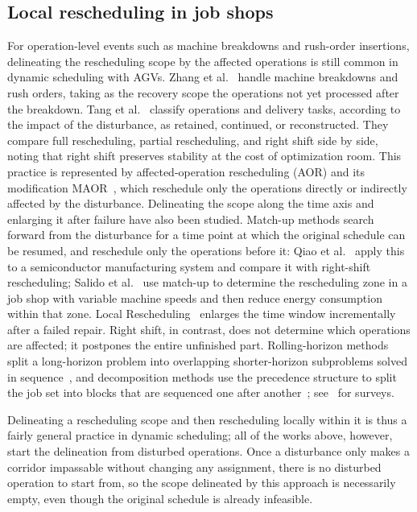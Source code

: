 \documentclass[manuscript,screen,review]{acmart}
\begin{document}
\subsection{Local rescheduling in job shops}
\label{sec:rw_aor}

For operation-level events such as machine breakdowns and rush-order insertions, delineating the rescheduling scope by the affected operations is still common in dynamic scheduling with AGVs.
Zhang et al.~\cite{zhang2023energy} handle machine breakdowns and rush orders, taking as the recovery scope the operations not yet processed after the breakdown.
Tang et al.~\cite{tang2026dynamic} classify operations and delivery tasks, according to the impact of the disturbance, as retained, continued, or reconstructed.
They compare full rescheduling, partial rescheduling, and right shift side by side, noting that right shift preserves stability at the cost of optimization room.
This practice is represented by affected-operation rescheduling (AOR) and its modification MAOR~\cite{subramaniam2003maor},
which reschedule only the operations directly or indirectly affected by the disturbance.
Delineating the scope along the time axis and enlarging it after failure have also been studied. Match-up methods search forward from the disturbance for a time point at which the original schedule can be resumed, and reschedule only the operations before it:
Qiao et al.~\cite{qiao2012single} apply this to a semiconductor manufacturing system and compare it with right-shift rescheduling;
Salido et al.~\cite{salido2017rescheduling} use match-up to determine the rescheduling zone in a job shop with variable machine speeds and then reduce energy consumption within that zone.
Local Rescheduling~\cite{kuster2007local} enlarges the time window incrementally after a failed repair.
Right shift, in contrast, does not determine which operations are affected; it postpones the entire unfinished part.
Rolling-horizon methods split a long-horizon problem into overlapping shorter-horizon subproblems solved in sequence~\cite{li2025learning},
and decomposition methods use the precedence structure to split the job set into blocks that are sequenced one after another~\cite{margot2003decompositions};
see~\cite{vieira2003rescheduling,ouelhadj2009survey} for surveys.

Delineating a rescheduling scope and then rescheduling locally within it is thus a fairly general practice in dynamic scheduling;
all of the works above, however, start the delineation from disturbed operations.
Once a disturbance only makes a corridor impassable without changing any assignment, there is no disturbed operation to start from, so the scope delineated by this approach is necessarily empty, even though the original schedule is already infeasible.
\end{document}
